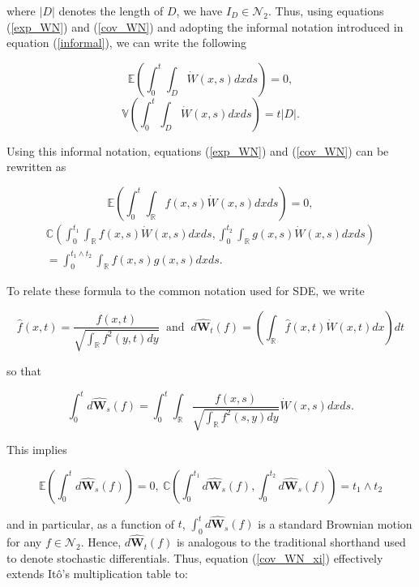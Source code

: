 \documentclass[]{elsarticle} %
\begin{document}
where \(|D|\) denotes the length of \(D\), we have
\(I_D\in\mathscr{N}_2\). Thus, using equations (\ref{exp_WN}) and
(\ref{cov_WN}) and adopting the informal notation introduced in equation
(\ref{informal}), we can write the following

\begin{equation}
\mathbb{E}\left(\int_0^t\int_D\dot W(x,s)dxds\right)=0,
\end{equation} \begin{equation}
\mathbb{V}\left(\int_0^t\int_D\dot W(x,s)dxds\right)=t|D|.
\end{equation}

Using this informal notation, equations (\ref{exp_WN}) and
(\ref{cov_WN}) can be rewritten as

\begin{equation}\label{exp_WN_xi}
\mathbb{E}\left(\int_0^t\int_\mathbb{R}f(x,s)\dot W(x,s)dxds\right)=0,
\end{equation} \begin{multline}\label{cov_WN_xi}
\mathbb{C}\left(\int_0^{t_1}\int_\mathbb{R}f(x,s)\dot W(x,s)dxds,\int_0^{t_2}\int_\mathbb{R}g(x,s)\dot W(x,s)dxds\right) \\
=\int_0^{t_1\wedge t_2}\int_\mathbb{R}f(x,s)g(x,s)dxds.
\end{multline}

To relate these formula to the common notation used for SDE, we write

\begin{equation}
\hat f(x,t)=\frac{f(x,t)}{\sqrt{\int_\mathbb{R}f^2(y,t)dy}} \ \text{ and } \ 
d\hat{\mathbf W}_t(f)=\left(\int_\mathbb{R}\hat f(x,t)\dot W(x,t)dx\right)dt
\end{equation}

so that

\begin{equation}
\int_0^td\hat{\mathbf W}_s(f)=\int_0^t\int_\mathbb{R}\frac{f(x,s)}{\sqrt{\int_\mathbb{R}f^2(s,y)dy}}\dot W(x,s)dxds.
\end{equation}

This implies

\begin{equation}
\mathbb{E}\left(\int_0^td\hat{\mathbf W}_s(f)\right)=0, \ \mathbb{C}\left(\int_0^{t_1}d\hat{\mathbf W}_s(f),\int_0^{t_2}d\hat{\mathbf W}_s(f)\right)=t_1\wedge t_2
\end{equation}

and in particular, as a function of \(t\),
\(\int_0^td\hat{\mathbf W}_s(f)\) is a standard Brownian motion for any
\(f\in\mathscr{N}_2\). Hence, \(d\hat{\mathbf W}_t(f)\) is analogous to
the traditional shorthand used to denote stochastic differentials. Thus,
equation (\ref{cov_WN_xi}) effectively extends Itô's multiplication
table to:
\end{document}
